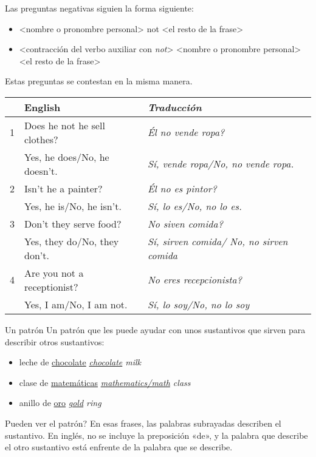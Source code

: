 Las preguntas negativas siguien la forma siguiente:
\begin{itemize}
	\item <conjugación correcta del verbo auxiliar> <nombre o pronombre personal> not <el resto de la frase>
	\item <contracción del verbo auxiliar con \emph{not}> <nombre o pronombre personal> <el resto de la frase> 
\end{itemize}
Estas preguntas se contestan en la misma manera.

\begin{table}[H]
	\centering
	\begin{tabular}{lp{7cm}p{8cm}}
		\toprule
			& \textbf{English} & \textbf{\emph{Traducci\'on}} \\
		\midrule
			1 & Does he not he sell clothes? & \emph{\textquestiondown Él no vende ropa?} \\
				& Yes, he does/No, he doesn't. & \emph{Sí, vende ropa/No, no vende ropa.} \\
			2 & Isn't he a painter? & \emph{\textquestiondown Él no es pintor?} \\
				& Yes, he is/No, he isn't. & \emph{Sí, lo es/No, no lo es.} \\
			3 & Don't they serve food? & \emph{\textquestiondown No siven comida?} \\
				& Yes, they do/No, they don't. & \emph{Sí, sirven comida/ No, no sirven comida} \\
			4 & Are you not a receptionist? & \emph{\textquestiondown No eres recepcionista?} \\
				& Yes, I am/No, I am not. & \emph{Sí, lo soy/No, no lo soy} \\
		\bottomrule
	\end{tabular}
\end{table}

\begin{conf}{Un patr\'on}
	Un patr\'on que les puede ayudar con unos sustantivos que sirven para describir otros sustantivos:
	\begin{itemize}
		\item leche de \underline{chocolate} \arr \emph{\underline{chocolate} milk}
		\item clase de \underline{matemáticas} \arr \emph{\underline{mathematics/math} class}
		\item anillo de \underline{oro} \arr \emph{\underline{gold} ring}
	\end{itemize}

	\textquestiondown Pueden ver el patr\'on?
	En esas frases, las palabras subrayadas describen el sustantivo.
	En ingl\'es, no se incluye la preposici\'on «de», y la palabra que describe el otro sustantivo está enfrente de
	la palabra que se describe.
\end{conf}

